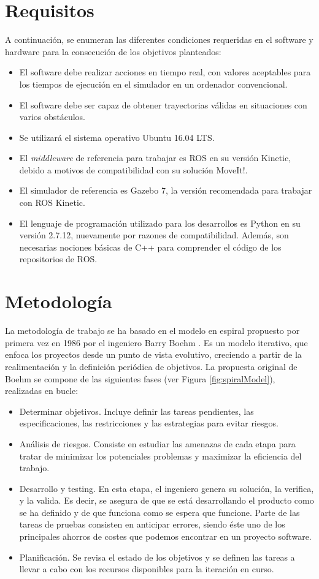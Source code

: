 \documentclass[12pt,spanish,chapterprefix, numbers=noenddot]{book}
\numberwithin{equation}{section}
\numberwithin{figure}{section}
\begin{document}
\section{Requisitos}
A continuación, se enumeran las diferentes condiciones requeridas en el software y hardware para la consecución de los objetivos planteados: 
\begin{itemize}
    \item El software debe realizar acciones en tiempo real, con valores aceptables para los tiempos de ejecución en el simulador en un ordenador convencional.
    \item El software debe ser capaz de obtener trayectorias válidas en situaciones con varios obstáculos.
    \item Se utilizará el sistema operativo Ubuntu 16.04 LTS.
    \item El \textit{middleware} de referencia para trabajar es ROS en su versión Kinetic, debido a motivos de compatibilidad con su solución MoveIt!.
    \item El simulador de referencia es Gazebo 7, la versión recomendada para trabajar con ROS Kinetic. 
    \item El lenguaje de programación utilizado para los desarrollos es Python en su versión 2.7.12, nuevamente por razones de compatibilidad. Además, son necesarias nociones básicas de C++ para comprender el código de los repositorios de ROS. 
\end{itemize}

\section{Metodología}
La metodología de trabajo se ha basado en el modelo en espiral propuesto por primera vez en 1986 por el ingeniero Barry Boehm \cite{boehm}. Es un modelo iterativo, que enfoca los proyectos desde un punto de vista evolutivo, creciendo a partir de la realimentación y la definición periódica de objetivos. 
La propuesta original de Boehm se compone de las siguientes fases (ver Figura \ref{fig:spiralModel}), realizadas en bucle: 
\begin{itemize}
    \item Determinar objetivos. Incluye definir las tareas pendientes, las especificaciones, las restricciones y las estrategias para evitar riesgos.
    \item Análisis de riesgos. Consiste en estudiar las amenazas de cada etapa para tratar de minimizar los potenciales problemas y maximizar la eficiencia del trabajo. 
    \item Desarrollo y testing. En esta etapa, el ingeniero genera su solución, la verifica, y la valida. Es decir, se asegura de que se está desarrollando el producto como se ha definido y de que funciona como se espera que funcione. Parte de las tareas de pruebas consisten en anticipar errores, siendo éste uno de los principales ahorros de costes \cite{ibm_costs} \cite{inc_costs} que podemos encontrar en un proyecto software. 
    \item Planificación. Se revisa el estado de los objetivos y se definen las tareas a llevar a cabo con los recursos disponibles para la iteración en curso.  
\end{itemize}
\end{document}

